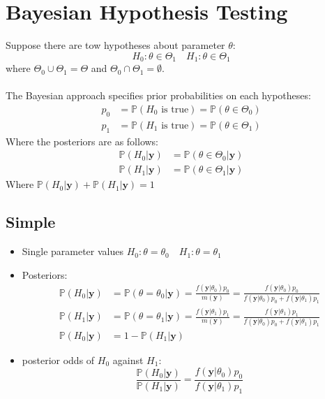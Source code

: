 \documentclass[12pt]{article}
\theoremstyle{definition}
\newcommand{\Prob}[1]{\mathbb{P}(#1)}
\begin{document}
\section{Bayesian Hypothesis Testing}
Suppose there are tow hypotheses about parameter $\theta$:
$$H_0:\theta \in \Theta_1 \quad H_1:\theta \in \Theta_1$$
where $\Theta_0 \cup \Theta_1 = \Theta$ and $\Theta_0 \cap \Theta_1 = \emptyset$.
\\~\\
The Bayesian approach specifies prior probabilities on each hypotheses:
\begin{align*}
    p_0 &= \Prob{H_0 \text{ is true}} = \Prob{\theta \in \Theta_0}\\
    p_1 &= \Prob{H_1 \text{ is true}} = \Prob{\theta \in \Theta_1}
\end{align*}
Where the posteriors are as follows:
\begin{align*}
    \Prob{H_0|\bm{y}} &= \Prob{\theta \in \Theta_0|\bm{y}}\\
    \Prob{H_1|\bm{y}} &= \Prob{\theta \in \Theta_1|\bm{y}}
\end{align*}
Where $\Prob{H_0|\bm{y}} + \Prob{H_1|\bm{y}} = 1$
\newpage
\subsection*{Simple}
\begin{itemize}
    \item Single parameter values $H_0:\theta = \theta_0 \quad H_1:\theta = \theta_1$
    \item Posteriors:
        \begin{align*}
            \Prob{H_0|\bm{y}} &= \Prob{\theta = \theta_0|\bm{y}} = \frac{f(\bm{y}|\theta_0)p_0}{m(\bm{y})} = \frac{f(\bm{y}|\theta_0)p_0}{f(\bm{y}|\theta_0)p_0 + f(\bm{y}|\theta_1)p_1}\\
            \Prob{H_1|\bm{y}} &= \Prob{\theta = \theta_1|\bm{y}} = \frac{f(\bm{y}|\theta_1)p_1}{m(\bm{y})} = \frac{f(\bm{y}|\theta_1)p_1}{f(\bm{y}|\theta_0)p_0 + f(\bm{y}|\theta_1)p_1}\\
            \Prob{H_0|\bm{y}} &= 1 - \Prob{H_1|\bm{y}}
        \end{align*}
    \item posterior odds of $H_0$ against $H_1$:
        $$\frac{\Prob{H_0|\bm{y}}}{\Prob{H_1|\bm{y}}} = \frac{f(\bm{y}|\theta_0)p_0}{f(\bm{y}|\theta_1)p_1}$$
\end{itemize}
\end{document}
